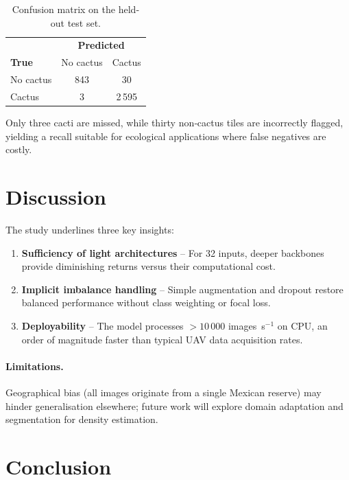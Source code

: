 \documentclass[11pt,a4paper]{article}
\begin{document}
\begin{table}[h]
  \centering
  \caption{Confusion matrix on the held‐out test set.}
  \label{tab:confusion}
  \begin{tabular}{lcc}
    \toprule
               & \multicolumn{2}{c}{\textbf{Predicted}}\\
    \cmidrule{2-3}
    \textbf{True}   & No cactus & Cactus \\
    \midrule
    No cactus & 843 & 30  \\
    Cactus    & 3   & 2\,595 \\
    \bottomrule
  \end{tabular}
\end{table}

Only three cacti are missed, while thirty non‐cactus tiles are incorrectly flagged, yielding a recall suitable for ecological applications where false negatives are costly.

\section{Discussion}\label{sec:discussion}

The study underlines three key insights:

\begin{enumerate}
  \item \textbf{Sufficiency of light architectures} -- For \SI{32}{\pixel} inputs, deeper backbones provide diminishing returns versus their computational cost.  
  \item \textbf{Implicit imbalance handling} -- Simple augmentation and dropout restore balanced performance without class weighting or focal loss.  
  \item \textbf{Deployability} -- The model processes $>10\,000$ images~s$^{-1}$ on CPU, an order of magnitude faster than typical UAV data acquisition rates.
\end{enumerate}

\paragraph{Limitations.}
Geographical bias (all images originate from a single Mexican reserve) may hinder generalisation elsewhere; future work will explore domain adaptation and segmentation for density estimation.

\section{Conclusion}\label{sec:conclusion}
\end{document}
